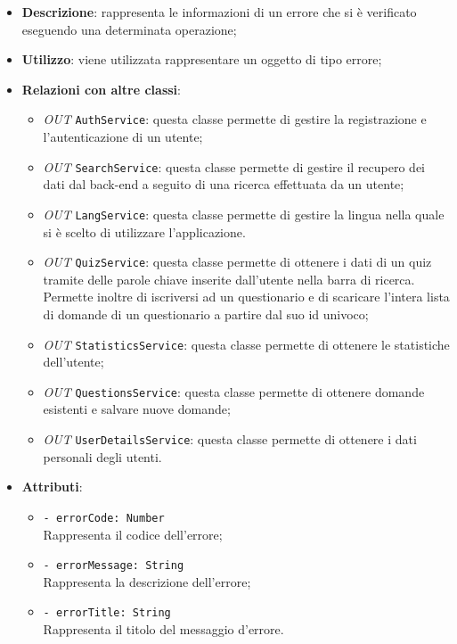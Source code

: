 		\begin{itemize}
			\item \textbf{Descrizione}: rappresenta le informazioni di un errore che si è verificato eseguendo una determinata operazione;
			\item \textbf{Utilizzo}: viene utilizzata rappresentare un oggetto di tipo errore;
			\item \textbf{Relazioni con altre classi}: 
			\begin{itemize}
			 	\item \textit{OUT} \texttt{AuthService}: questa classe permette di gestire la registrazione e l'autenticazione di un utente;
			 	\item \textit{OUT} \texttt{SearchService}: questa classe permette di gestire il recupero dei dati dal back-end a seguito di una ricerca effettuata da un utente;
			 	\item \textit{OUT} \texttt{LangService}: questa classe permette di gestire la lingua nella quale si è scelto di utilizzare l'applicazione.
			 	\item \textit{OUT} \texttt{QuizService}: questa classe permette di ottenere i dati di un quiz tramite delle parole chiave inserite dall'utente nella barra di ricerca. Permette inoltre di iscriversi ad un questionario e di scaricare l'intera lista di domande di un questionario a partire dal suo id univoco;
			 	\item \textit{OUT} \texttt{StatisticsService}: questa classe permette di ottenere le statistiche dell'utente;
		 		\item \textit{OUT} \texttt{QuestionsService}: questa classe permette di ottenere domande esistenti e salvare nuove domande;
	 			\item \textit{OUT} \texttt{UserDetailsService}: questa classe permette di ottenere i dati personali degli utenti.
			\end{itemize}
			\item \textbf{Attributi}: 
			\begin{itemize}
				\item \texttt{- errorCode: Number} \\ 
				Rappresenta il codice dell'errore;
				\item \texttt{- errorMessage: String} \\ 
				Rappresenta la descrizione dell'errore; 
				\item \texttt{- errorTitle: String}\\ 
				Rappresenta il titolo del messaggio d'errore.
			\end{itemize}

\end{itemize}
